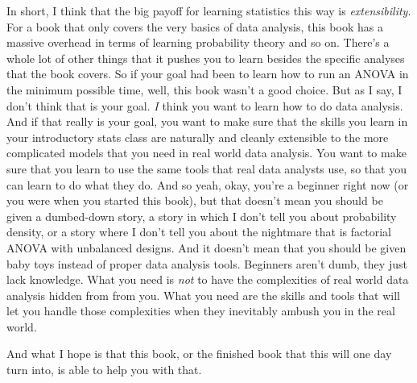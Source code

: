 In short, I think that the big payoff for learning statistics this way is {\it extensibility}. For a book that only covers the very basics of data analysis, this book has a massive overhead in terms of learning probability theory and so on. There's a whole lot of other things that it pushes you to learn besides the specific analyses that the book covers. So if your goal had been to learn how to run an ANOVA in the minimum possible time, well, this book wasn't a good choice. But as I say, I don't think that is your goal. {\it I} think you want to learn how to do data analysis. And if that really is your goal, you want to make sure that the skills you learn in your introductory stats class are naturally and cleanly extensible to the more complicated models that you need in real world data analysis. You want to make sure that you learn to use the same tools that real data analysts use, so that you can learn to do what they do. And so yeah, okay, you're a beginner right now (or you were when you started this book), but that doesn't mean you should be given a dumbed-down story, a story in which I don't tell you about probability density, or a story where I don't tell you about the nightmare that is factorial ANOVA with unbalanced designs. And it doesn't mean that you should be given baby toys instead of proper data analysis tools. Beginners aren't dumb, they just lack knowledge. What you need is {\it not} to have the complexities of real world data analysis hidden from from you. What you need are the skills and tools that will let you handle those complexities when they inevitably ambush you in the real world. 

And what I hope is that this book, or the finished book that this will one day turn into, is able to help you with that.

